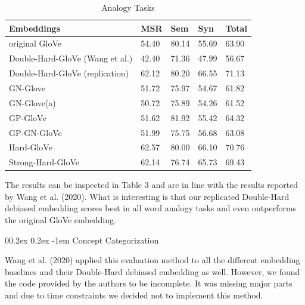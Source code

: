 \documentclass[
  english,
  man,floatsintext]{apa6}
\makeatletter
\let\oldparagraph\paragraph
\renewcommand{\paragraph}[1]{\oldparagraph{#1}\mbox{}}
\renewcommand{\paragraph}{\@startsection{paragraph}{4}{\parindent}%
  {0\baselineskip \@plus 0.2ex \@minus 0.2ex}%
  {-1em}%
  {\normalfont\normalsize\bfseries\itshape\typesectitle}}
\makeatother
\begin{document}
\begin{table}[tbp]

\begin{center}
\begin{threeparttable}

\caption{\label{tab:table 3}Analogy Tasks}

\begin{tabular}{lllll}
\toprule
Embeddings & MSR & Sem & Syn & Total\\
\midrule
original GloVe & 54.40 & 80.14 & 55.69 & 63.90\\
Double-Hard-GloVe (Wang et al.) & 42.40 & 71.36 & 47.99 & 56.67\\
Double-Hard-GloVe (replication) & 62.12 & 80.20 & 66.55 & 71.13\\
GN-Glove & 51.72 & 75.97 & 54.67 & 61.82\\
GN-Glove(a) & 50.72 & 75.89 & 54.26 & 61.52\\
GP-GloVe & 51.62 & 81.92 & 55.42 & 64.32\\
GP-GN-GloVe & 51.99 & 75.75 & 56.68 & 63.08\\
Hard-GloVe & 62.57 & 80.00 & 66.10 & 70.76\\
Strong-Hard-GloVe & 62.14 & 76.74 & 65.73 & 69.43\\
\bottomrule
\end{tabular}

\end{threeparttable}
\end{center}

\end{table}

The results can be inspected in Table 3 and are in line with the results reported by Wang et al. (2020). What is interesting is that our replicated Double-Hard debiased embedding scores best in all word analogy tasks and even outperforms the original GloVe embedding.

\hypertarget{concept-categorization}{%
\paragraph{Concept Categorization}\label{concept-categorization}}

Wang et al. (2020) applied this evaluation method to all the different embedding baselines and their Double-Hard debiased embedding as well. However, we found the code provided by the authors to be incomplete. It was missing major parts and due to time constraints we decided not to implement this method.
\end{document}
